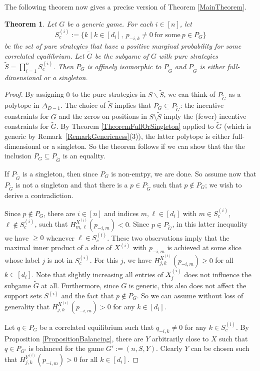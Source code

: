 \documentclass[11pt]{amsart}
\newtheorem{theorem}{Theorem}[section]
\theoremstyle{definition}
\numberwithin{subcase}{case}
\renewcommand{\tilde}[1]{\widetilde{#1}}
\begin{document}
The following theorem now gives a precise version of Theorem \ref{MainTheorem}.
\begin{theorem}
\label{thm:MainTheorem2}
Let $G$ be a generic game.  For each $i \in [n]$, let \[ S_c^{(i)}:=
\{k \mid k \in [d_i], \ p_{-i,k} \neq 0 \ \text{for some} \ p \in P_G \}
\] be the set of pure strategies that have a positive marginal probability
for some correlated equilibrium. Let $\tilde{G}$ be the subgame of $G$
with pure strategies $\tilde{S}=\prod_{i=1}^n S_c^{(i)}$. Then $P_G$
is affinely isomorphic to $P_{\tilde{G}}$ and $P_{\tilde{G}}$ is either
full-dimensional or a singleton.
\end{theorem}
\begin{proof}
By assigning $0$ to the pure strategies in $S \backslash \tilde{S}$,
we can think of $P_{\tilde{G}}$ as a polytope in $\Delta_{D-1}$. The
choice of $\tilde{S}$ implies that $P_G \subseteq P_{\tilde{G}}$: the
incentive constraints for $G$ and the zeros on positions in $S \setminus
\tilde{S}$ imply the (fewer) incentive constraints for $\tilde{G}$. By
Theorem \ref{TheoremFullOrSingleton} applied to $\tilde{G}$ (which is
generic by Remark~\ref{RemarkGenericness}(3)), the latter polytope is
either full-dimensional or a singleton. So the theorem follows if we can
show that the the inclusion $P_G \subseteq P_{\tilde{G}}$ is an equality.

If $P_{\tilde{G}}$ is a singleton, then since $P_G$ is non-emtpy, we are done. So assume now that $P_{\tilde{G}}$ is not a singleton and that there is a $p \in P_{\tilde{G}}$ such that $p \not\in P_G$; we wish to derive a contradiction. 

Since $p \not\in P_G$, there are $i \in [n]$ and indices $m, \ell \in
[d_i]$ with $m \in S^{(i)}_c$, $\ell \not\in S^{(i)}_c$, such that
$H^{X^{(i)}}_{m,\ell}(p_{-i,m})<0.$ Since $p \in P_{\tilde{G}}$, in
this latter inequality we have $\geq 0$ whenever $\ell \in S^{(i)}_c$. These two
observations imply that the maximal inner product of a slice of $X^{(i)}$
with $p_{-i,m}$ is achieved at some slice whose label $j$ is not in
$S^{(i)}_c$. For this $j$, we have $H^{X^{(i)}}_{j,k}(p_{-i,m})
\geq 0$ for all $k \in [d_i]$. Note that slightly increasing all
entries of $X^{(i)}_j$ does not influence the subgame $\tilde{G}$ at
all. Furthermore, since $G$ is generic, this also does not affect the
support sets $S^{(i)}$ and the fact that $p \not \in P_{G}$. So we can
assume without loss of generality that $H^{X^{(i)}}_{j,k}(p_{-i,m})
> 0$ for any $k \in [d_i]$.

Let $q \in P_G$ be a correlated equilibrium such that $q_{-i,k} \neq 0$
for any $k \in S^{(i)}_c$. By Proposition \ref{PropositionBalancing},
there are $Y$ arbitrarily close to $X$ such that $q \in P_{G'}$ is
balanced for the game $G':=(n,S,Y)$. Clearly $Y$ can be chosen
such that $H^{Y^{(i)}}_{j,k}(p_{-i,m}) > 0$ for all $k \in [d_i]$.


\end{proof}
\end{document}
